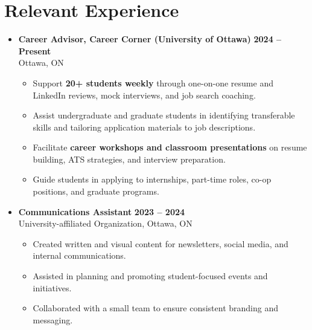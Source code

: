 \documentclass[a4paper,9pt]{article} %
\begin{document}
\section{Relevant Experience}
\begin{itemize}[leftmargin=0.15in, label={}]

\item \textbf{Career Advisor, Career Corner (University of Ottawa)} \hfill \textbf{2024 -- Present}\\
Ottawa, ON
\begin{itemize}[leftmargin=0.3in, label={-}]
    \item Support \textbf{20+ students weekly} through one-on-one resume and LinkedIn reviews, mock interviews, and job search coaching.
    \item Assist undergraduate and graduate students in identifying transferable skills and tailoring application materials to job descriptions.
    \item Facilitate \textbf{career workshops and classroom presentations} on resume building, ATS strategies, and interview preparation.
    \item Guide students in applying to internships, part-time roles, co-op positions, and graduate programs.
\end{itemize}

\item \textbf{Communications Assistant} \hfill \textbf{2023 -- 2024}\\
University-affiliated Organization, Ottawa, ON
\begin{itemize}[leftmargin=0.3in, label={-}]
    \item Created written and visual content for newsletters, social media, and internal communications.
    \item Assisted in planning and promoting student-focused events and initiatives.
    \item Collaborated with a small team to ensure consistent branding and messaging.
\end{itemize}

\end{itemize}

\end{document}
